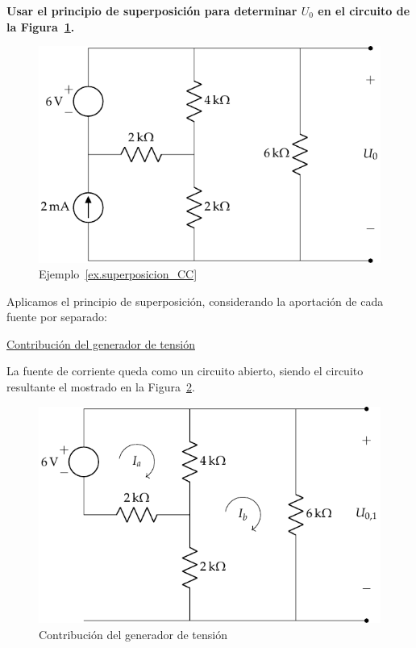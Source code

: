 \begin{example}\label{ex.superposicion_CC}
    \textbf{Usar el principio de superposición para determinar $U_0$ en el circuito de la Figura~\ref{fig.ej_superposicion_cc}.}
    \begin{figure}[H]
        \centering
        \includegraphics[width=0.6\linewidth]{../figs/ej_superposicion_cc.pdf}
        \caption{Ejemplo~\ref{ex.superposicion_CC}}
        \label{fig.ej_superposicion_cc}
    \end{figure}

    Aplicamos el principio de superposición, considerando la aportación de cada fuente por separado:

    \vspace{3mm}
    \underline{Contribución del generador de tensión}

    \vspace{2mm}
    La fuente de corriente queda como un circuito abierto, siendo el circuito resultante el mostrado en la Figura~\ref{fig.ej_superposicion_cc_tension}. 
    \begin{figure}[H]
        \centering
        \includegraphics[width=0.6\linewidth]{../figs/ej_superposicion_cc_tension.pdf}
        \caption{Contribución del generador de tensión}
        \label{fig.ej_superposicion_cc_tension}
    \end{figure}
    

\end{example}
